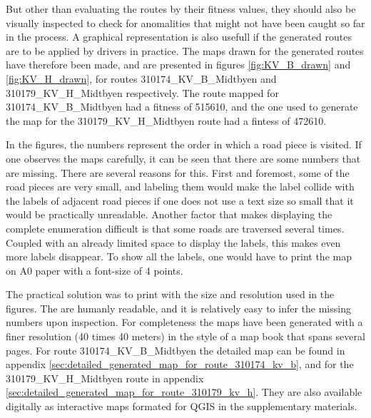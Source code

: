 {
\begin{table}[tbph]
\centering
{} %
\caption{The best result obtained from the MA and the known optimal solution for the BHW1 benchmark.}
\label{tab:trondheim_data_fitness_comparisons}
\end{table}
}

But other than evaluating the routes by their fitness values, they should also be visually inspected to check for anomalities that might not have been caught so far in the process. A graphical representation is also usefull if the generated routes are to be applied by drivers in practice. The maps drawn for the generated routes have therefore been made, and are presented in figures \ref{fig:KV_B_drawn} and \ref{fig:KV_H_drawn}, for routes 310174\_KV\_B\_Midtbyen and 310179\_KV\_H\_Midtbyen respectively. The route mapped for 310174\_KV\_B\_Midtbyen had a fitness of 515610, and the one used to generate the map for the 310179\_KV\_H\_Midtbyen route had a fintess of 472610.

In the figures, the numbers represent the order in which a road piece is visited. If one observes the maps carefully, it can be seen that there are some numbers that are missing. There are several reasons for this. First and foremost, some of the road pieces are very small, and labeling them would make the label collide with the labels of adjacent road pieces if one does not use a text size so small that it would be practically unreadable. Another factor that makes displaying the complete enumeration difficult is that some roads are traversed several times. Coupled with an already limited space to display the labels, this makes even more labels disappear. To show all the labels, one would have to print the map on A0 paper with a font-size of 4 points.

The practical solution was to print with the size and resolution used in the figures. The are humanly readable, and it is relatively easy to infer the missing numbers upon inspection. For completeness the maps have been generated with a finer resolution (40 times 40 meters) in the style of a map book that spans several pages. For route 310174\_KV\_B\_Midtbyen the detailed map can be found in appendix \ref{sec:detailed_generated_map_for_route_310174_kv_b}, and for the 310179\_KV\_H\_Midtbyen route in appendix \ref{sec:detailed_generated_map_for_route_310179_kv_h}. They are also available digitally as interactive maps formated for QGIS in the supplementary materials.

